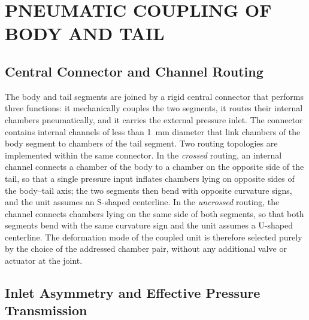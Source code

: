 

\section{PNEUMATIC COUPLING OF BODY AND TAIL}
\label{sec:lizard-connector}

\subsection{Central Connector and Channel Routing}

The body and tail segments are joined by a rigid central connector that
performs three functions: it mechanically couples the two segments, it
routes their internal chambers pneumatically, and it carries the external
pressure inlet. The connector contains internal channels of less than
1~mm diameter that link chambers of the body segment to chambers of the
tail segment. Two routing topologies are implemented within the same
connector. In the \emph{crossed} routing, an internal channel connects a
chamber of the body to a chamber on the opposite side of the tail, so
that a single pressure input inflates chambers lying on opposite sides of
the body--tail axis; the two segments then bend with opposite curvature
signs, and the unit assumes an S-shaped centerline. In the
\emph{uncrossed} routing, the channel connects chambers lying on the same
side of both segments, so that both segments bend with the same curvature
sign and the unit assumes a U-shaped centerline. The deformation mode of
the coupled unit is therefore selected purely by the choice of the
addressed chamber pair, without any additional valve or actuator at the
joint.

\subsection{Inlet Asymmetry and Effective Pressure Transmission}

